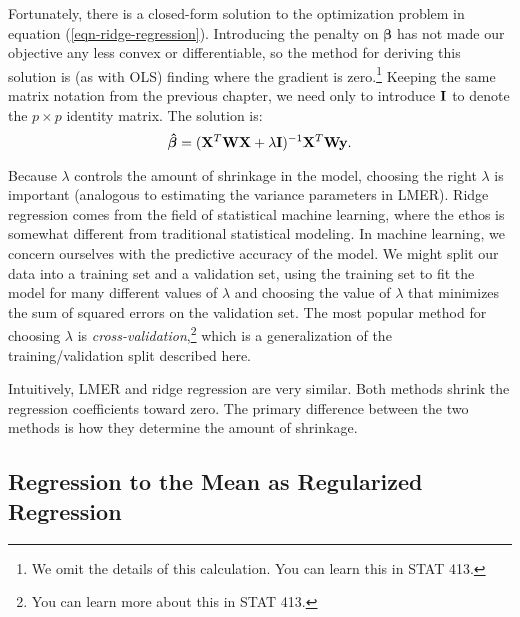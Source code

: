 \documentclass{article}
\begin{document}
  Fortunately, there is a closed-form solution to the optimization problem in equation (\ref{eqn-ridge-regression}). Introducing the penalty on $\boldsymbol{\beta}$ has not made our objective any less convex or differentiable, so the method for deriving this solution is (as with OLS) finding where the gradient is zero.\footnote{We omit the details of this calculation. You can learn this in STAT 413.} Keeping the same matrix notation from the previous chapter, we need only to introduce ${\bf I}$ to denote the $p \times p$ identity matrix. The solution is:
  \begin{equation*}
    \boldsymbol{\hat\beta} = ({\bf X}^T {\bf W} {\bf X} + \lambda {\bf I})^{-1} {\bf X}^T {\bf W} {\bf y}.
  \end{equation*}

  Because $\lambda$ controls the amount of shrinkage in the model, choosing the right $\lambda$ is important (analogous to estimating the variance parameters in LMER). Ridge regression comes from the field of statistical machine learning, where the ethos is somewhat different from traditional statistical modeling. In machine learning, we concern ourselves with the predictive accuracy of the model. We might split our data into a training set and a validation set, using the training set to fit the model for many different values of $\lambda$ and choosing the value of $\lambda$ that minimizes the sum of squared errors on the validation set. The most popular method for choosing $\lambda$ is {\it cross-validation},\footnote{You can learn more about this in STAT 413.} which is a generalization of the training/validation split described here.

  Intuitively, LMER and ridge regression are very similar. Both methods shrink the regression coefficients toward zero. The primary difference between the two methods is how they determine the amount of shrinkage.

  \subsection{\sc Regression to the Mean as Regularized Regression}
\end{document}
